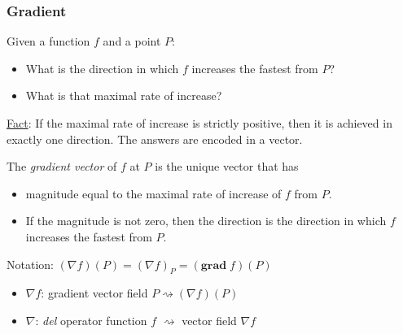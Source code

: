 \begin{frame}
  \frametitle{Gradient}
  Given a function $f$ and a point $P$:
\begin{itemize}
  \item What is the direction in which $f$ increases the fastest from $P$?
  \item What is that maximal rate of increase?
\end{itemize}
%
\pause
\underline{Fact}: If the maximal rate of increase is strictly positive, then it is achieved in exactly one direction. \pause The answers are encoded in a vector.

\begin{definition}
   The \emph{gradient vector} of $f$ at $P$ is the unique vector that has
\begin{itemize}
  \item magnitude equal to the maximal rate of increase of $f$ from $P$.
  \item If the magnitude is not zero, then the direction is the direction in which $f$ increases the fastest from $P$.
\end{itemize}
\end{definition}
%
Notation: $(\nabla f)(P) = (\nabla f)_P = (\textbf{grad} \;f)(P)$

\begin{itemize}
  \item $\nabla f$: gradient vector field \hspace{2cm}
$P \rightsquigarrow (\nabla f)(P)$
%
\item $\nabla$: \emph{del} operator \hspace{2cm}
function $f$ $\rightsquigarrow$ vector field $\nabla f$
\end{itemize}

\end{frame}